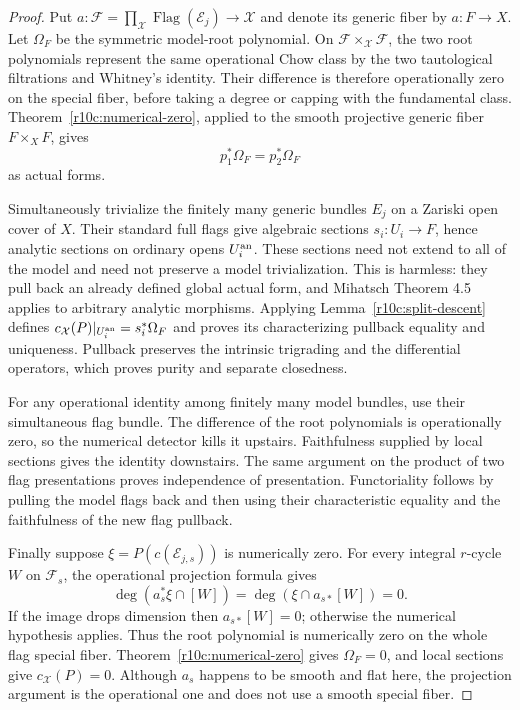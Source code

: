 \begin{proof}
Put $a:\mathcal F=\prod_{\mathcal X}\operatorname{Flag}(\mathcal E_j)
\to\mathcal X$ and denote its generic fiber by $a:F\to X$.
Let $\Omega_F$ be the symmetric model-root polynomial.  On
$\mathcal F\times_{\mathcal X}\mathcal F$, the two root polynomials
represent the same operational Chow class by the two tautological
filtrations and Whitney's identity.  Their difference is therefore
operationally zero on the special fiber, before taking a degree or
capping with the fundamental class.  Theorem~\ref{r10c:numerical-zero},
applied to the smooth projective generic fiber $F\times_XF$, gives
\[
                         p_1^*\Omega_F=p_2^*\Omega_F
\]
as actual forms.

Simultaneously trivialize the finitely many generic bundles $E_j$ on
a Zariski open cover of $X$.  Their standard full flags give algebraic
sections $s_i:U_i\to F$, hence analytic sections on ordinary opens
$U_i^{\rm an}$.  These sections need not extend to all of the model
and need not preserve a model trivialization.  This is harmless:
they pull back an already defined global actual form, and Mihatsch
Theorem 4.5 applies to arbitrary analytic morphisms.  Applying
Lemma~\ref{r10c:split-descent} defines
$c_{\mathcal X}(P)|_{U_i^{\rm an}}=s_i^*\Omega_F$ and proves its
characterizing pullback equality and uniqueness.  Pullback preserves
the intrinsic trigrading and the differential operators, which proves
purity and separate closedness.

For any operational identity among finitely many model bundles, use
their simultaneous flag bundle.  The difference of the root polynomials
is operationally zero, so the numerical detector kills it upstairs.
Faithfulness supplied by local sections gives the identity downstairs.
The same argument on the product of two flag presentations proves
independence of presentation.  Functoriality follows by pulling the
model flags back and then using their characteristic equality and the
faithfulness of the new flag pullback.

Finally suppose $\xi=P(c(\mathcal E_{j,s}))$ is numerically zero.
For every integral $r$-cycle $W$ on $\mathcal F_s$, the operational
projection formula gives
\[
                 \deg(a_s^*\xi\cap[W])=
                 \deg(\xi\cap a_{s*}[W])=0.
\]
If the image drops dimension then $a_{s*}[W]=0$; otherwise the numerical
hypothesis applies.  Thus the root polynomial is numerically zero on
the whole flag special fiber.  Theorem~\ref{r10c:numerical-zero}
gives $\Omega_F=0$, and local sections give $c_{\mathcal X}(P)=0$.
Although $a_s$ happens to be smooth and flat here, the projection
argument is the operational one and does not use a smooth special fiber.
\end{proof}

